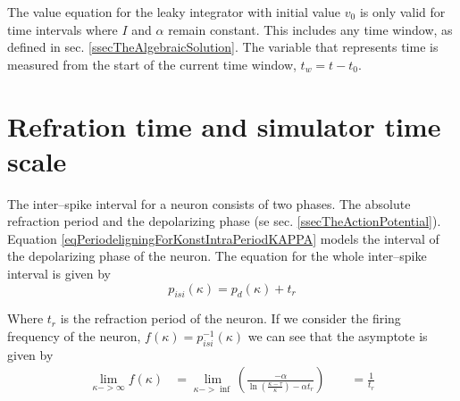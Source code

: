 	The value equation for the leaky integrator with initial value $v_0$ is only valid for time intervals where $I$ and $\alpha$ remain constant.
	This includes any time window, as defined in sec. \ref{ssecTheAlgebraicSolution}.
	The variable that represents time is measured from the start of the current time window, $t_w = t - t_0$.






\section{Refration time and simulator time scale}
\label{appendixRefractionTimeAndSimulationTimeScale} %

The inter--spike interval for a neuron consists of two phases. 
The absolute refraction period and the depolarizing phase (se sec. \ref{ssecTheActionPotential}).
Equation \eqref{eqPeriodeligningForKonstIntraPeriodKAPPA} models the interval of the depolarizing phase of the neuron. %
The equation for the whole inter--spike interval is given by
\begin{equation}
	p_{isi}(\kappa) = p_d(\kappa) + t_r
	\label{eqHeilePerioden}
\end{equation}

Where $t_r$ is the refraction period of the neuron. %
If we consider the firing frequency of the neuron, $f(\kappa) = p_{isi}^{-1}(\kappa)$ we can see that the asymptote is given by
\begin{equation}
	\begin{split}
		\lim_{\kappa->\infty}{ f(\kappa)} &= \lim_{\kappa->\inf}\left( \frac{-\alpha}{\ln \left( \frac{\kappa - \tau}{\kappa} \right) - \alpha t_r} \right)   \qquad = \frac{1}{t_r} \\ 
	\end{split}
	\label{eqFrekvensLlim} 
\end{equation}

